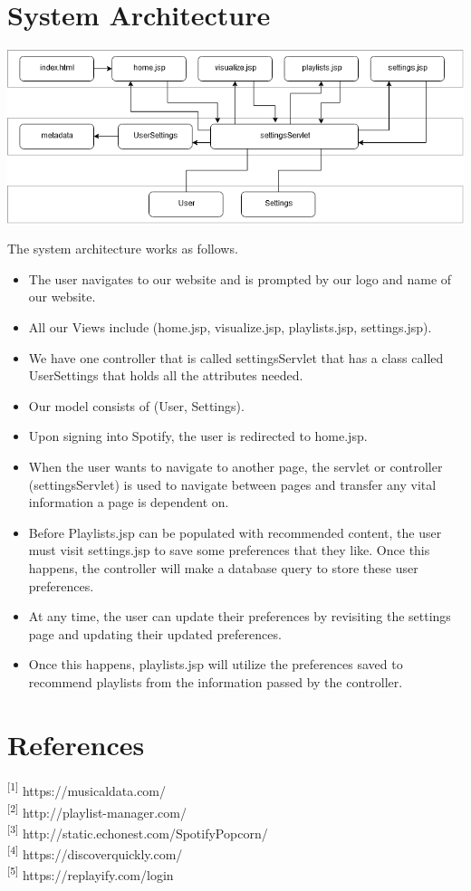 \documentclass[letter, 11pt]{article}
\begin{document}
\section*{System Architecture}

\includegraphics[scale=0.64,left]{er_tables/mvc.png}

The system architecture works as follows.
\begin{itemize}
    \item The user navigates to our website and is prompted by our logo and name of our website.
    \item All our Views include (home.jsp, visualize.jsp, playlists.jsp, settings.jsp).
    \item We have one controller that is called settingsServlet that has a class called UserSettings that holds all the attributes needed.
    \item Our model consists of (User, Settings).
    \item Upon signing into Spotify, the user is redirected to home.jsp.
    \item When the user wants to navigate to another page, the servlet or controller (settingsServlet) is used to navigate between pages and transfer any vital information a page is dependent on.
    \item Before Playlists.jsp can be populated with recommended content, the user must visit settings.jsp to save some preferences that they like. Once this happens, the controller will make a database query to store these user preferences.
    \item At any time, the user can update their preferences by revisiting the settings page and updating their updated preferences.
    \item Once this happens, playlists.jsp will utilize the preferences saved to recommend playlists from the information passed by the controller.
\end{itemize}






\section*{References}

\noindent
{\textsuperscript{[1]} https://musicaldata.com/} \\
{\textsuperscript{[2]} http://playlist-manager.com/} \\
{\textsuperscript{[3]} http://static.echonest.com/SpotifyPopcorn/}\\
{\textsuperscript{[4]} https://discoverquickly.com/}\\
{\textsuperscript{[5]} https://replayify.com/login}
\end{document}
